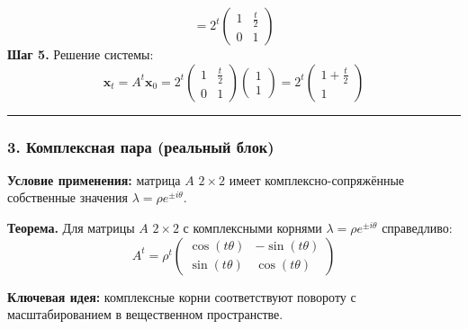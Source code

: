 {$$= 2^t \begin{pmatrix} 1 & \frac{t}{2} \\ 0 & 1 \end{pmatrix}$$
\textbf{Шаг 5.} Решение системы:
$$\mathbf{x}_t = A^t\mathbf{x}_0 = 2^t \begin{pmatrix} 1 & \frac{t}{2} \\ 0 & 1 \end{pmatrix}\begin{pmatrix} 1 \\ 1 \end{pmatrix} = 2^t \begin{pmatrix} 1 + \frac{t}{2} \\ 1 \end{pmatrix}$$
}

\bigskip
\hrule
\bigskip

\subsubsection*{3. Комплексная пара (реальный блок)}

\textbf{Условие применения:} матрица $A$ $2 \times 2$ имеет комплексно-сопряжённые собственные значения $\lambda = \rho e^{\pm i\theta}$.

\textbf{Теорема.} Для матрицы $A$ $2 \times 2$ с комплексными корнями $\lambda = \rho e^{\pm i\theta}$ справедливо:
\[
A^t = \rho^t \begin{pmatrix} \cos(t\theta) & -\sin(t\theta) \\ \sin(t\theta) & \cos(t\theta) \end{pmatrix}
\]

\textbf{Ключевая идея:} комплексные корни соответствуют повороту с масштабированием в вещественном пространстве.


